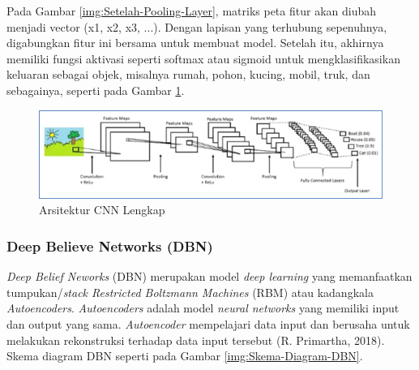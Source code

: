 \begin{enumerate}
	Pada Gambar \ref{img:Setelah-Pooling-Layer}, matriks peta fitur akan diubah menjadi vector (x1, x2, x3, ...). Dengan lapisan yang terhubung sepenuhnya, digabungkan fitur ini bersama untuk membuat model. Setelah itu, akhirnya memiliki fungsi aktivasi seperti softmax atau sigmoid untuk mengklasifikasikan keluaran sebagai objek, misalnya rumah, pohon, kucing, mobil, truk, dan sebagainya, seperti pada Gambar \ref{img:Arsitektur-CNN-Lengkap}.
	
	\begin{figure}[H]
		\vspace{-0.1cm}
		\begin{center}
			\includegraphics[width=0.5\columnwidth]{bab2/Gambar/Picture26.png}
		\end{center}
		\vspace{-0.2cm}
		\captionsetup{justification=centering}
		\caption{Arsitektur CNN Lengkap}\label{img:Arsitektur-CNN-Lengkap}
	\end{figure}
	
\end{enumerate}

\subsubsection{Deep Believe Networks (DBN)}
\hspace{1,2cm}\textit{Deep Belief Neworks} (DBN) merupakan model \textit{deep learning} yang memanfaatkan tumpukan/\textit{stack Restricted Boltzmann Machines} (RBM) atau kadangkala \textit{Autoencoders}. \textit{Autoencoders} adalah model \textit{neural networks} yang memiliki input dan output yang sama. \textit{Autoencoder} mempelajari data input dan berusaha untuk melakukan rekonstruksi terhadap data input tersebut (R. Primartha, 2018).  Skema diagram DBN seperti pada Gambar \ref{img:Skema-Diagram-DBN}.

